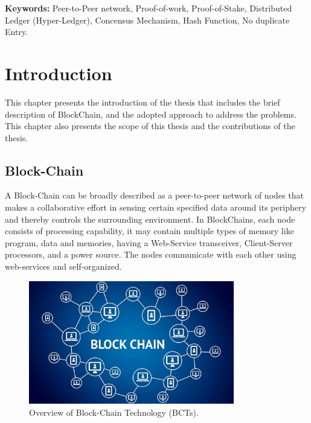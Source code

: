 \documentclass[a4paper,12pt]{report}
\begin{document}
\textbf{Keywords:} Peer-to-Peer network, Proof-of-work, Proof-of-Stake, Distributed Ledger (Hyper-Ledger), Concensus Mechanism, Hash Function, No duplicate Entry.


\pagebreak \tableofcontents

\afterpage{\null\newpage}

\chapter{Introduction}
\label{Ch1} \setcounter{page}{1} 
\bigskip
\bigskip
\bigskip
This chapter presents the introduction of the thesis that includes the brief description of BlockChain, and the adopted approach to address the problems. This chapter also presents the scope of this thesis and the contributions of the thesis.

\section{Block-Chain}
A Block-Chain can be broadly described as a peer-to-peer network of nodes that makes a collaborative effort in sensing certain specified data around its periphery and thereby controls the surrounding environment. In BlockChains, each node consists of
processing capability, it may contain multiple types of memory like program, data and memories, having a Web-Service
transceiver, Client-Server processors, and a power source. The nodes communicate with each other using web-services and self-organized.

\begin{figure}
\begin{center}
\includegraphics[width=0.8\textwidth]{blockchain.jpeg}
\end{center}
\caption{Overview of Block-Chain Technology (BCTs).}
\end{figure}
\end{document}

